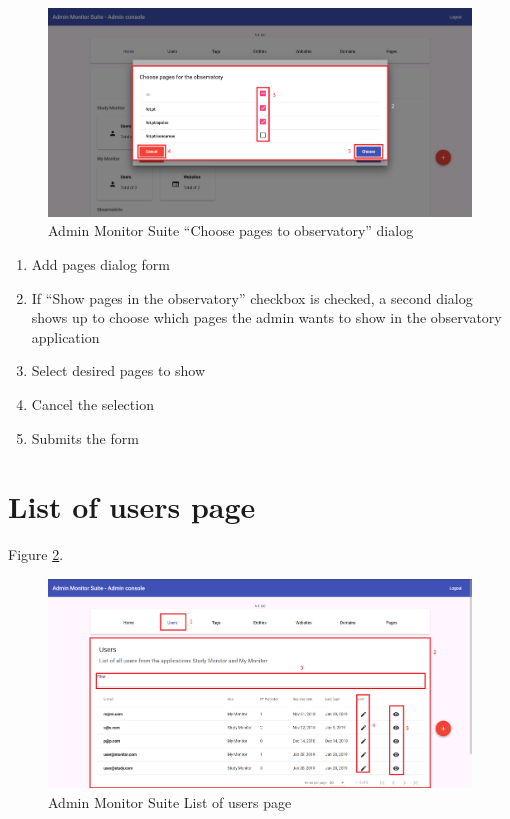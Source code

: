 \begin{figure}[H]
    \centering
    \includegraphics[width=\linewidth]{lib/images/admin/admin_add_pages_dialog_2.png}
    \caption{Admin Monitor Suite ``Choose pages to observatory'' dialog }
    \label{fig:admin_chosse_pages_observatory_dialog}
\end{figure}

\begin{enumerate}
    \item Add pages dialog form
    \item If ``Show pages in the observatory'' checkbox is checked, a second dialog shows up to choose which pages the admin wants to show in the observatory application
    \item Select desired pages to show
    \item Cancel the selection
    \item Submits the form
\end{enumerate}

\section{List of users page}

Figure \ref{fig:admin_list_users_page}.

\begin{figure}[H]
    \centering
    \includegraphics[width=\linewidth]{lib/images/admin/admin_list_users_page.png}
    \caption{Admin Monitor Suite List of users page}
    \label{fig:admin_list_users_page}
\end{figure}

